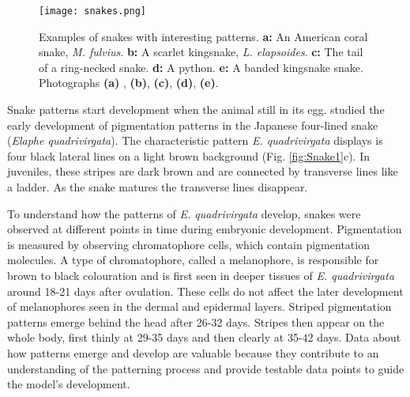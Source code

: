\begin{figure}[hb]
	\centering
	\texttt{[image: snakes.png]}
	\caption[Examples of snakes with interesting patterns]{Examples of snakes with interesting patterns. \textbf{a:} An American coral snake, \textit{M. fulvius}. \textbf{b:} A scarlet kingsnake, \textit{L. elapsoides}. \textbf{c:} The tail of a ring-necked snake. \textbf{d:} A python. \textbf{e:} A banded kingsnake snake. Photographs \textbf{(a)} , \textbf{(b)}, \textbf{(c)}, \textbf{(d)}, \textbf{(e)}.}
	\label{fig:realSnakePatterns}
\end{figure}


Snake patterns start development when the animal still in its egg. \citet{murakami2018} studied the early development of pigmentation patterns in the Japanese four-lined snake (\textit{Elaphe quadrivirgata}). The characteristic pattern \textit{E. quadrivirgata} displays is four black lateral lines on a light brown background (Fig. \ref{fig:Snake1}c). In juveniles, these stripes are dark brown and are connected by transverse lines like a ladder. As the snake matures the transverse lines disappear.
 
To understand how the patterns of \textit{E. quadrivirgata} develop, snakes were observed at different points in time during embryonic development. Pigmentation is measured by observing chromatophore cells, which contain pigmentation molecules. A type of chromatophore, called a melanophore, is responsible for brown to black colouration and is first seen in deeper tissues of \textit{E. quadrivirgata} around 18-21 days after ovulation. These cells do not affect the later development of melanophores seen in the dermal and epidermal layers. Striped pigmentation patterns emerge behind the head after 26-32 days. Stripes then appear on the whole body, first thinly at 29-35 days and then clearly at 35-42 days. Data about how patterns emerge and develop are valuable because they contribute to an understanding of the patterning process and provide testable data points to guide the model's development.

